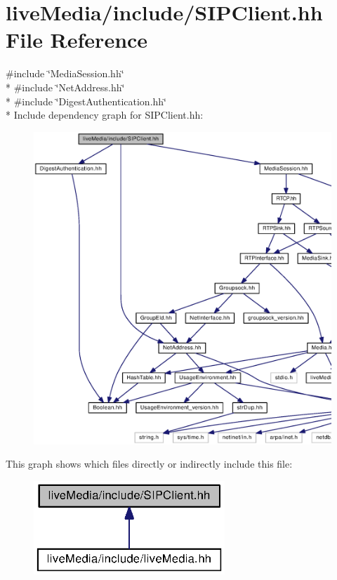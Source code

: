\section{live\+Media/include/\+S\+I\+P\+Client.hh File Reference}
\label{SIPClient_8hh}
{\ttfamily \#include \char`\"{}Media\+Session.\+hh\char`\"{}}\\*
{\ttfamily \#include \char`\"{}Net\+Address.\+hh\char`\"{}}\\*
{\ttfamily \#include \char`\"{}Digest\+Authentication.\+hh\char`\"{}}\\*
Include dependency graph for S\+I\+P\+Client.\+hh\+:
\nopagebreak
\begin{figure}[H]
\begin{center}
\leavevmode
\includegraphics[width=350pt]{SIPClient_8hh__incl}
\end{center}
\end{figure}
This graph shows which files directly or indirectly include this file\+:
\nopagebreak
\begin{figure}[H]
\begin{center}
\leavevmode
\includegraphics[width=204pt]{SIPClient_8hh__dep__incl}
\end{center}
\end{figure}
